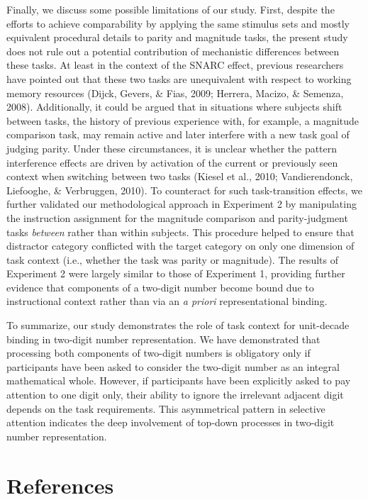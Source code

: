 \documentclass[english,man]{apa6}
\theoremstyle{definition}
\theoremstyle{definition}
\theoremstyle{definition}
\theoremstyle{remark}
\begin{document}
Finally, we discuss some possible limitations of our study. First,
despite the efforts to achieve comparability by applying the same
stimulus sets and mostly equivalent procedural details to parity and
magnitude tasks, the present study does not rule out a potential
contribution of mechanistic differences between these tasks. At least in
the context of the SNARC effect, previous researchers have pointed out
that these two tasks are unequivalent with respect to working memory
resources (Dijck, Gevers, \& Fias, 2009; Herrera, Macizo, \& Semenza,
2008). Additionally, it could be argued that in situations where
subjects shift between tasks, the history of previous experience with,
for example, a magnitude comparison task, may remain active and later
interfere with a new task goal of judging parity. Under these
circumstances, it is unclear whether the pattern interference effects
are driven by activation of the current or previously seen context when
switching between two tasks (Kiesel et al., 2010; Vandierendonck,
Liefooghe, \& Verbruggen, 2010). To counteract for such task-transition
effects, we further validated our methodological approach in Experiment
2 by manipulating the instruction assignment for the magnitude
comparison and parity-judgment tasks \emph{between} rather than within
subjects. This procedure helped to ensure that distractor category
conflicted with the target category on only one dimension of task
context (i.e., whether the task was parity or magnitude). The results of
Experiment 2 were largely similar to those of Experiment 1, providing
further evidence that components of a two-digit number become bound due
to instructional context rather than via an \emph{a priori}
representational binding.

To summarize, our study demonstrates the role of task context for
unit-decade binding in two-digit number representation. We have
demonstrated that processing both components of two-digit numbers is
obligatory only if participants have been asked to consider the
two-digit number as an integral mathematical whole. However, if
participants have been explicitly asked to pay attention to one digit
only, their ability to ignore the irrelevant adjacent digit depends on
the task requirements. This asymmetrical pattern in selective attention
indicates the deep involvement of top-down processes in two-digit number
representation.

\newpage

\section{References}\label{references}
\end{document}
